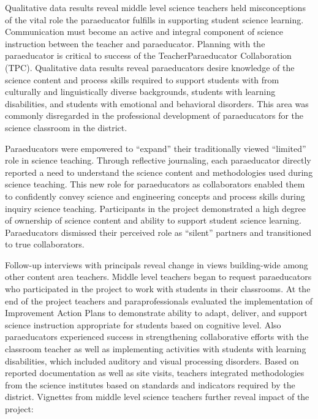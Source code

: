 \documentclass[11.5pt]{sig-alternate} %
\begin{document}
\begin{large}
Qualitative data results reveal middle level science teachers held misconceptions of the vital role the paraeducator fulfills in supporting student science learning. Communication must become an active and integral component of science instruction between the teacher and paraeducator. Planning with the paraeducator is critical to success of the TeacherParaeducator Collaboration (TPC). Qualitative data results reveal paraeducators desire knowledge of the science content and process skills required to support students with from culturally and linguistically diverse backgrounds, students with learning disabilities, and students with emotional and behavioral disorders. This area was commonly disregarded in the professional development of paraeducators for the science classroom in the district. 

Paraeducators were empowered to “expand” their traditionally viewed “limited” role in science teaching. Through reflective journaling, each paraeducator directly reported a need to understand the science content and methodologies used during science teaching. This new role for paraeducators as collaborators enabled them to confidently convey science and engineering concepts and process skills during inquiry science teaching. Participants in the project demonstrated a high degree of ownership of science content and ability to support student science learning. Paraeducators dismissed their perceived role as “silent” partners and transitioned to true collaborators. 

Follow-up interviews with principals reveal change in views building-wide among other content area teachers. Middle level teachers began to request paraeducators who participated in the project to work with students in their classrooms. At the end of the project teachers and paraprofessionals evaluated the implementation of Improvement Action Plans to demonstrate ability to adapt, deliver, and support science instruction appropriate for students based on cognitive level. Also paraeducators experienced success in strengthening collaborative efforts with the classroom teacher as well as implementing activities with students with learning disabilities, which included auditory and visual processing disorders. Based on reported documentation as well as site visits, teachers integrated methodologies from the science institutes based on standards and indicators required by the district. Vignettes from middle level science teachers further reveal impact of the project:


\end{large}
\end{document}
